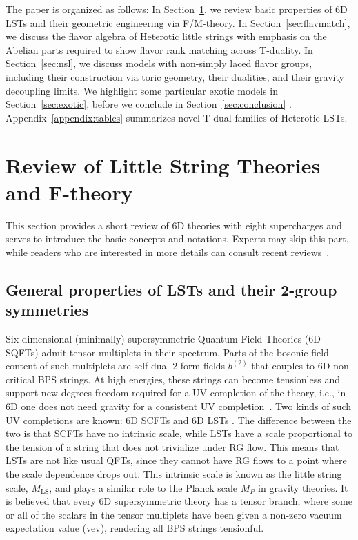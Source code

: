 \documentclass[11pt]{article}
\numberwithin{equation}{section}
\begin{document}
The paper is organized as follows:
In Section~\ref{sec:review}, we review basic properties of 6D LSTs and their geometric engineering via F/M-theory. In Section~\ref{sec:flavmatch}, we discuss the	 flavor algebra of Heterotic little strings with emphasis on the Abelian parts required to show flavor rank matching across T-duality. In Section~\ref{sec:nsl}, we discuss models with non-simply laced flavor groups, including their construction via toric geometry, their dualities, and their gravity decoupling limits. We highlight some particular exotic models in Section~\ref{sec:exotic}, before we conclude in Section~\ref{sec:conclusion} . Appendix~\ref{appendix:tables} summarizes novel T-dual families of Heterotic LSTs.


\section{Review of Little String Theories and F-theory}
\label{sec:review}
This section provides a short review of 6D theories with eight supercharges and serves to introduce the basic concepts and notations. Experts may skip this part, while readers who are interested in more details can consult recent reviews~\cite{Weigand:2018rez,Heckman:2018jxk,DelZotto:2022xrh,DelZotto:2023ahf}.

\subsection{General properties of LSTs and their 2-group symmetries}
Six-dimensional (minimally) supersymmetric Quantum Field Theories (6D SQFTs) admit tensor multiplets in their spectrum. Parts of the bosonic field content of such multiplets are self-dual 2-form fields $b^{(2)}$ that couples to 6D non-critical BPS strings. At high energies, these strings can become tensionless and support new degrees freedom required for a UV completion of the theory, i.e., in 6D one does not need gravity for a consistent UV completion~\cite{Seiberg:1996vs,Witten:1995zh}. Two kinds of such UV completions are known: 6D SCFTs and 6D LSTs \cite{Seiberg:1996qx,Seiberg:1997zk}. The difference between the two is that SCFTs have no intrinsic scale, while LSTs have a scale proportional to the tension of a string that does not trivialize under RG flow. This means that LSTs are not like usual QFTs, since they cannot have RG flows to a point where the scale dependence drops out. This intrinsic scale is known as the little string scale, $M_\text{LS}$, and plays a similar role to the Planck scale $M_{P}$ in gravity theories. It is believed that every 6D supersymmetric theory has a tensor branch, where some or all of the scalars in the tensor multiplets have been given a non-zero vacuum expectation value (vev), rendering all BPS strings tensionful. 
\end{document}
